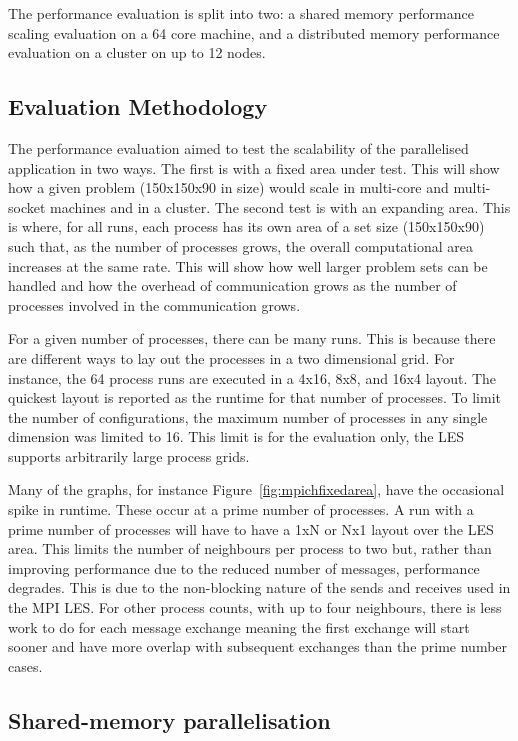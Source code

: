 The performance evaluation is split into two: a shared memory performance
scaling evaluation on a 64 core machine, and a distributed memory performance
evaluation on a cluster on up to 12 nodes.

\subsection{Evaluation Methodology}
\label{sec:mpievaluationmethodology}

The performance evaluation aimed to test the scalability of the parallelised
application in two ways. The first is with a fixed area under test. This will
show how a given problem (150x150x90 in size) would scale in multi-core and
multi-socket machines and in a cluster. The second test is with an expanding
area. This is where, for all runs, each process has its own area of a set size
(150x150x90) such that, as the number of processes grows, the overall
computational area increases at the same rate. This will show how well larger
problem sets can be handled and how the overhead of communication grows as the
number of processes involved in the communication grows.

For a given number of processes, there can be many runs. This is because there
are different ways to lay out the processes in a two dimensional grid. For
instance, the 64 process runs are executed in a 4x16, 8x8, and 16x4 layout. The
quickest layout is reported as the runtime for that number of processes. To
limit the number of configurations, the maximum number of processes in any
single dimension was limited to 16. This limit is for the evaluation only, the
LES supports arbitrarily large process grids.

Many of the graphs, for instance Figure~\ref{fig:mpichfixedarea}, have the
occasional spike in runtime. These occur at a prime number of processes. A run
with a prime number of processes will have to have a 1xN or Nx1 layout over the
LES area. This limits the number of neighbours per process to two but, rather
than improving performance due to the reduced number of messages, performance
degrades. This is due to the non-blocking nature of the sends and receives used
in the MPI LES. For other process counts, with up to four neighbours, there is
less work to do for each message exchange meaning the first exchange will start
sooner and have more overlap with subsequent exchanges than the prime number
cases.

\subsection{Shared-memory parallelisation}



